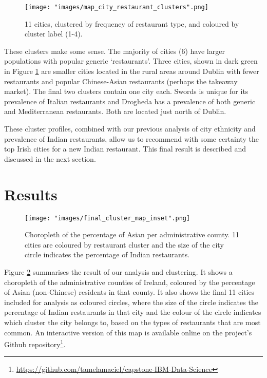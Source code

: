 \documentclass[a4paper,11pt]{article}
\begin{document}
%
\begin{figure}[H]
   \centering
   \texttt{[image: "images/map\_city\_restaurant\_clusters".png]}
      \caption{11 cities, clustered by frequency of restaurant type, and coloured by cluster label (1-4).}
      \label{fig:city clusters}
\end{figure}
%
These clusters make some sense. The majority of cities (6) have larger populations with popular generic `restaurants'. Three cities, shown in dark green in Figure \ref{fig:city clusters} are smaller cities located in the rural areas around Dublin with fewer restaurants and popular Chinese-Asian restaurants (perhaps the takeaway market). The final two clusters contain one city each. Swords is unique for its prevalence of Italian restaurants and Drogheda has a prevalence of both generic and Mediterranean restaurants. Both are located just north of Dublin.

These cluster profiles, combined with our previous analysis of city ethnicity and prevalence of Indian restaurants, allow us to recommend with some certainty the top Irish cities for a new Indian restaurant. This final result is described and discussed in the next section.

\section{Results}\label{sec: results}
%
\begin{figure}[htb]
   \centering
   \texttt{[image: "images/final\_cluster\_map\_inset".png]}
      \caption{Choropleth of the percentage of Asian per administrative county. 11 cities are coloured by restaurant cluster and the size of the city circle indicates the percentage of Indian restaurants.}
      \label{fig:final cluster map}
\end{figure}
%
Figure \ref{fig:final cluster map} summarises the result of our analysis and clustering. It shows a choropleth of the administrative counties of Ireland, coloured by the percentage of Asian (non-Chinese) residents in that county. It also shows the final 11 cities included for analysis as coloured circles, where the size of the circle indicates the percentage of Indian restaurants in that city and the colour of the circle indicates which cluster the city belongs to, based on the types of restaurants that are most common. An interactive version of this map is available online on the project's Github repository\footnote{\url{https://github.com/tamelamaciel/capstone-IBM-Data-Science}}.
\end{document}
